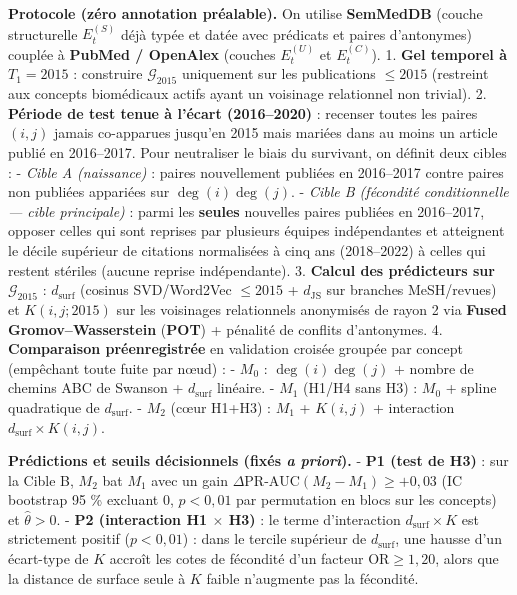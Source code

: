 \documentclass[a4paper,11pt]{article}
\begin{document}
\textbf{Protocole (zéro annotation préalable).} On utilise
\textbf{SemMedDB} (couche structurelle \(E_t^{(S)}\) déjà typée et datée
avec prédicats et paires d'antonymes) couplée à \textbf{PubMed /
OpenAlex} (couches \(E_t^{(U)}\) et \(E_t^{(C)}\)). 1. \textbf{Gel
temporel à \(T_1 = 2015\)} : construire \(\mathcal{G}_{2015}\)
uniquement sur les publications \(\le 2015\) (restreint aux concepts
biomédicaux actifs ayant un voisinage relationnel non trivial). 2.
\textbf{Période de test tenue à l'écart (2016--2020)} : recenser toutes
les paires \((i,j)\) jamais co-apparues jusqu'en 2015 mais mariées dans
au moins un article publié en 2016--2017. Pour neutraliser le biais du
survivant, on définit deux cibles : - \emph{Cible A (naissance)} :
paires nouvellement publiées en 2016--2017 contre paires non publiées
appariées sur \(\deg(i)\deg(j)\). - \emph{Cible B (fécondité
conditionnelle --- cible principale)} : parmi les \textbf{seules}
nouvelles paires publiées en 2016--2017, opposer celles qui sont
reprises par plusieurs équipes indépendantes et atteignent le décile
supérieur de citations normalisées à cinq ans (2018--2022) à celles qui
restent stériles (aucune reprise indépendante). 3. \textbf{Calcul des
prédicteurs sur \(\mathcal{G}_{2015}\)} : \(d_{\mathrm{surf}}\) (cosinus
SVD/Word2Vec \(\le 2015\) + \(d_{\mathrm{JS}}\) sur branches
MeSH/revues) et \(K(i,j;2015)\) sur les voisinages relationnels
anonymisés de rayon 2 via \textbf{Fused Gromov--Wasserstein}
(\textbf{POT}) + pénalité de conflits d'antonymes. 4.
\textbf{Comparaison préenregistrée} en validation croisée groupée par
concept (empêchant toute fuite par nœud) : - \(M_0\) :
\(\deg(i)\deg(j)\) + nombre de chemins ABC de Swanson +
\(d_{\mathrm{surf}}\) linéaire. - \(M_1\) (H1/H4 sans H3) : \(M_0\) +
spline quadratique de \(d_{\mathrm{surf}}\). - \(M_2\) (cœur H1+H3) :
\(M_1\) + \(K(i,j)\) + interaction \(d_{\mathrm{surf}} \times K(i,j)\).

\textbf{Prédictions et seuils décisionnels (fixés \emph{a priori}).} -
\textbf{P1 (test de H3)} : sur la Cible B, \(M_2\) bat \(M_1\) avec un
gain \(\Delta\text{PR-AUC}(M_2 - M_1) \ge +0{,}03\) (IC bootstrap 95 \%
excluant \(0\), \(p < 0{,}01\) par permutation en blocs sur les
concepts) et \(\hat{\theta} > 0\). - \textbf{P2 (interaction H1
\(\times\) H3)} : le terme d'interaction \(d_{\mathrm{surf}} \times K\)
est strictement positif (\(p < 0{,}01\)) : dans le tercile supérieur de
\(d_{\mathrm{surf}}\), une hausse d'un écart-type de \(K\) accroît les
cotes de fécondité d'un facteur \(\text{OR} \ge 1{,}20\), alors que la
distance de surface seule à \(K\) faible n'augmente pas la fécondité.
\end{document}
